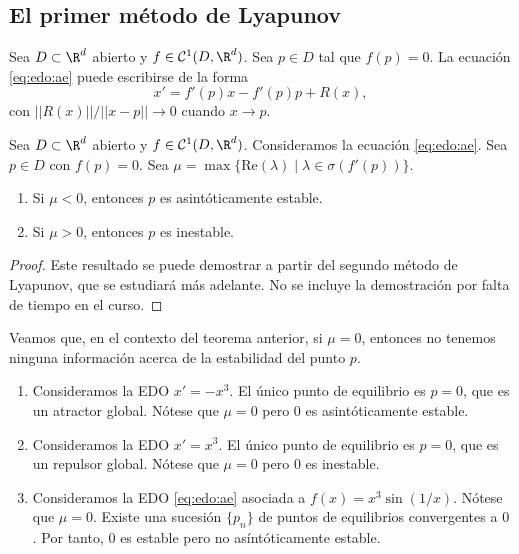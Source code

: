 \subsection{El primer método de Lyapunov}

Sea $D \subset \R^d$ abierto y $f \in \mathcal{C}^1(D, \R^d)$. Sea $p \in D$ tal que $f(p) = 0$. La
ecuación \eqref{eq:edo:ae} puede escribirse de la forma
\begin{equation}
  \label{eq:3}
  x' = f'(p)x - f'(p)p + R(x),
\end{equation}
con $||R(x)|| / ||x-p|| \to 0$ cuando $x\to p$.

\begin{theorem}
  \label{thm:lyapunov}
  Sea $D \subset \R^d$ abierto y $f \in \mathcal{C}^1(D, \R^d)$. Consideramos la ecuación
  \eqref{eq:edo:ae}.  Sea $p \in D$ con $f(p) = 0$. Sea
  $\mu = \max \{\mathrm{Re}(\lambda) \mid \lambda \in \sigma(f'(p))\}$.
  \begin{enumerate}
  \item Si $\mu < 0$, entonces $p$ es asintóticamente estable.
  \item Si $\mu > 0$, entonces $p$ es inestable.
  \end{enumerate}
\end{theorem}
\begin{proof}
  Este resultado se puede demostrar a partir del segundo método de Lyapunov, que se estudiará más
  adelante. No se incluye la demostración por falta de tiempo en el curso.
\end{proof}

\begin{ex}
  Veamos que, en el contexto del teorema anterior, si $\mu = 0$, entonces no tenemos ninguna
  información acerca de la estabilidad del punto $p$.
  \begin{enumerate}
  \item Consideramos la EDO $x' = -x^3$. El único punto de equilibrio es $p = 0$, que es un atractor
    global. Nótese que $\mu = 0$ pero $0$ es asintóticamente estable.
  \item Consideramos la EDO $x' = x^3$. El único punto de equilibrio es $p = 0$, que es un repulsor
    global. Nótese que $\mu = 0$ pero $0$ es inestable.
  \item Consideramos la EDO \eqref{eq:edo:ae} asociada a $f(x) = x^3 \sin(1/x)$.  Nótese que
    $\mu = 0$. Existe una sucesión $\{p_n\}$ de puntos de equilibrios convergentes a $0$. Por tanto,
    $0$ es estable pero no asíntóticamente estable. \qedhere
  \end{enumerate}
\end{ex}

